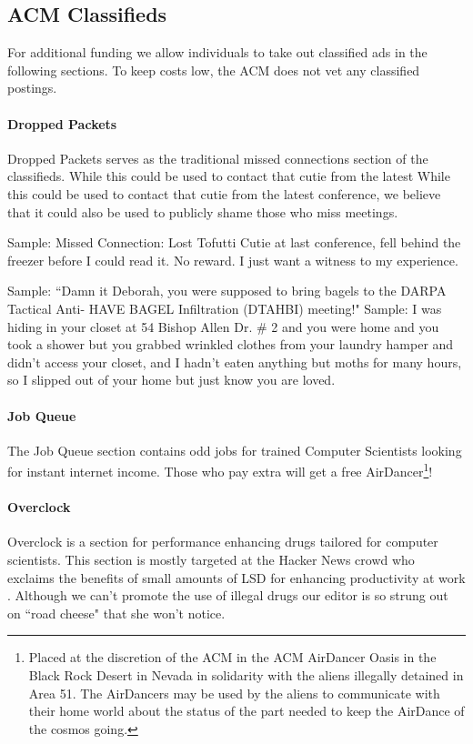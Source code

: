 \subsection{ACM Classifieds}
For additional funding we allow individuals to take out classified ads in the
following sections.
To keep costs low, the ACM does not vet any classified postings.

\paragraph{Dropped Packets}
Dropped Packets serves as the traditional missed connections section of the
classifieds. While this could be used to contact that cutie from the latest
While this could be used to contact that cutie from the latest conference, we
believe that it could also be used to publicly shame those who miss meetings.

Sample: Missed Connection: Lost Tofutti Cutie at last conference, fell behind the freezer before I could read it. No reward. I just want a witness to my experience.

Sample: ``Damn it Deborah, you were supposed to bring bagels to the DARPA
Tactical Anti- HAVE BAGEL Infiltration 
(DTAHBI) meeting!"
Sample: I was hiding in your closet at 54 Bishop Allen Dr. # 2 and you were home and you took a shower but you grabbed wrinkled clothes from your laundry hamper and didn't access your closet, and I hadn't eaten anything but moths for many hours, so I slipped out of your home but just know you are loved.

\paragraph{Job Queue}
The Job Queue section contains odd jobs for trained Computer Scientists looking
for instant internet income.
Those who pay extra will get a free AirDancer\footnote{Placed at the discretion
of the ACM in the ACM AirDancer Oasis in the Black Rock Desert in Nevada in
solidarity with the aliens illegally detained in Area 51. The AirDancers may
be used by the aliens to communicate with their home world about the status of the part needed to keep the AirDance of the cosmos going.}!




\paragraph{Overclock}
Overclock is a section for performance enhancing drugs tailored for computer
scientists.
This section is mostly targeted at the Hacker News \cite{hn} crowd who exclaims
the benefits of small amounts of LSD for enhancing productivity at work
\cite{microdose, lsd-song}.
Although we can't promote the use of illegal drugs our editor is so strung out
on ``road cheese" that she won't notice.

